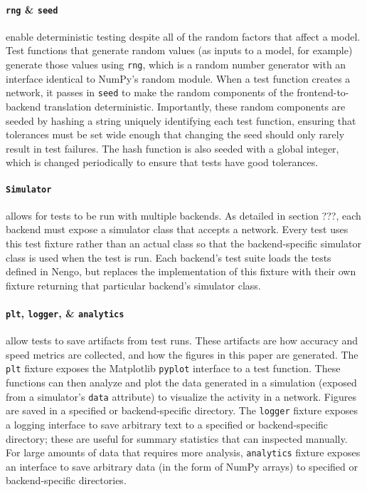 \documentclass{frontiersSCNS}
\begin{document}
\paragraph{\texttt{rng} \& \texttt{seed}}
enable deterministic testing despite
all of the random factors that affect a model.
Test functions that generate random values
(as inputs to a model, for example)
generate those values using \texttt{rng},
which is a random number generator
with an interface identical to
NumPy's random module.
When a test function creates a network,
it passes in \texttt{seed} to make
the random components
of the frontend-to-backend translation deterministic.
Importantly, these random components
are seeded by hashing a string uniquely
identifying each test function,
ensuring that tolerances must be set
wide enough that changing the seed
should only rarely result in test failures.
The hash function is also seeded
with a global integer,
which is changed periodically to ensure
that tests have good tolerances.

\paragraph{\texttt{Simulator}}
allows for tests to be run with multiple backends.
As detailed in section ???,
each backend must expose a simulator class
that accepts a network.
Every test uses this test fixture rather than
an actual class so that
the backend-specific simulator class is used
when the test is run.
Each backend's test suite loads
the tests defined in Nengo,
but replaces the implementation of
this fixture with their own fixture
returning that particular backend's simulator class.

\paragraph{\texttt{plt}, \texttt{logger}, \& \texttt{analytics}}
allow tests to save artifacts from test runs.
These artifacts are how accuracy and speed metrics
are collected, and how the figures
in this paper are generated.
The \texttt{plt} fixture exposes the Matplotlib \cite{???}
\texttt{pyplot} interface to a test function.
These functions can then analyze and plot
the data generated in a simulation
(exposed from a simulator's \texttt{data} attribute)
to visualize the activity in a network.
Figures are saved in a specified or backend-specific directory.
The \texttt{logger} fixture exposes a logging interface
to save arbitrary text to a specified
or backend-specific directory;
these are useful for summary statistics
that can inspected manually.
For large amounts of data that
requires more analysis,
\texttt{analytics} fixture exposes an interface
to save arbitrary data (in the form of NumPy arrays)
to specified or backend-specific directories.
\end{document}
